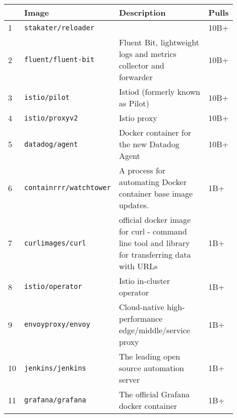 \begin{table}[hbt]
    \centering
    \begin{tabular}{| p{0.02\linewidth} | p{0.3\linewidth} | p{0.5\linewidth} | p{0.08\linewidth} |}
        \hline
        \centering \textbf{}     & \centering \textbf{Image}              & \centering \textbf{Description}                                    & \centering\arraybackslash \textbf{Pulls} \\ \hline
        1  & \texttt{stakater/reloader}     &                                                                                                 & 10B+  \\ \hline
        2  & \texttt{fluent/fluent-bit}     & Fluent Bit, lightweight logs and metrics collector and forwarder                                & 10B+  \\ \hline
        3  & \texttt{istio/pilot}           & Istiod (formerly known as Pilot)                                                                & 10B+  \\ \hline
        4  & \texttt{istio/proxyv2}         & Istio proxy                                                                                     & 10B+  \\ \hline
        5  & \texttt{datadog/agent}         & Docker container for the new Datadog Agent                                                      & 10B+  \\ \hline
        6  & \texttt{containrrr/watchtower} & A process for automating Docker container base image updates.                                   & 1B+   \\ \hline
        7  & \texttt{curlimages/curl}       & official docker image for curl - command line tool and library  for transferring data with URLs & 1B+   \\ \hline
        8  & \texttt{istio/operator}        & Istio in-cluster operator                                                                       & 1B+   \\ \hline
        9  & \texttt{envoyproxy/envoy}      & Cloud-native high-performance edge/middle/service proxy                                         & 1B+   \\ \hline
        10 & \texttt{jenkins/jenkins}       & The leading open source automation server                                                       & 1B+   \\ \hline
        11 & \texttt{grafana/grafana}       & The official Grafana docker container                                                           & 1B+   \\ \hline

\end{tabular}
\end{table}
